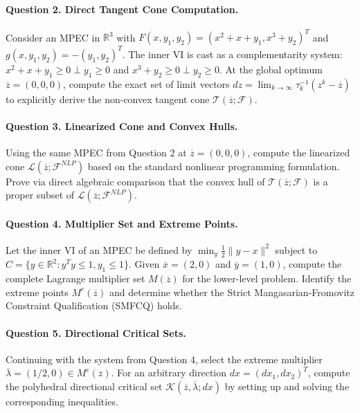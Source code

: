 \documentclass[pdflatex,sn-mathphys-num]{sn-jnl}%
\theoremstyle{definition}
\begin{document}
    \paragraph{Question 2. Direct Tangent Cone Computation.} Consider an MPEC in $\mathbb{R}^3$ with $F(x,y_1,y_2) = (x^2+x+y_1, x^3+y_2)^T$ and $g(x,y_1,y_2) = -(y_1,y_2)^T$. The inner VI is cast as a complementarity system: $x^2+x+y_1 \ge 0 \perp y_1 \ge 0$ and $x^3+y_2 \ge 0 \perp y_2 \ge 0$. 
    At the global optimum $\overline{z} = (0,0,0)$, compute the exact set of limit vectors $dz = \lim_{k\to\infty} \tau_k^{-1}(z^k - \overline{z})$ to explicitly derive the non-convex tangent cone $\mathcal{T}(\overline{z}; \mathcal{F})$.

    \paragraph{Question 3. Linearized Cone and Convex Hulls.} Using the same MPEC from Question 2 at $\overline{z} = (0,0,0)$, compute the linearized cone $\mathcal{L}(\overline{z}; \mathcal{F}^{NLP})$ based on the standard nonlinear programming formulation. Prove via direct algebraic comparison that the convex hull of $\mathcal{T}(\overline{z}; \mathcal{F})$ is a proper subset of $\mathcal{L}(\overline{z}; \mathcal{F}^{NLP})$.

    \paragraph{Question 4. Multiplier Set and Extreme Points.} Let the inner VI of an MPEC be defined by $\min_{y} \frac{1}{2}\|y-x\|^2$ subject to $C = \{y \in \mathbb{R}^2 : y^T y \le 1, y_1 \le 1\}$. 
    Given $\overline{x} = (2,0)$ and $\overline{y} = (1,0)$, compute the complete Lagrange multiplier set $M(\overline{z})$ for the lower-level problem. Identify the extreme points $M^e(\overline{z})$ and determine whether the Strict Mangasarian-Fromovitz Constraint Qualification (SMFCQ) holds.

    \paragraph{Question 5. Directional Critical Sets.} Continuing with the system from Question 4, select the extreme multiplier $\overline{\lambda} = (1/2, 0) \in M^e(\overline{z})$. For an arbitrary direction $dx = (dx_1, dx_2)^T$, compute the polyhedral directional critical set $\mathcal{K}(\overline{z}, \overline{\lambda}; dx)$ by setting up and solving the corresponding inequalities.
\end{document}
